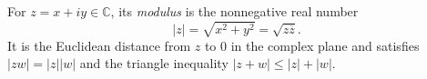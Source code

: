 
For $z=x+iy\in\mathbb C$, its \emph{modulus} is the nonnegative real number
\[
|z|=\sqrt{x^2+y^2}=\sqrt{z\overline z}.
\]
It is the Euclidean distance from $z$ to $0$ in the complex plane and satisfies $|zw|=|z||w|$ and the triangle inequality $|z+w|\le|z|+|w|$.
